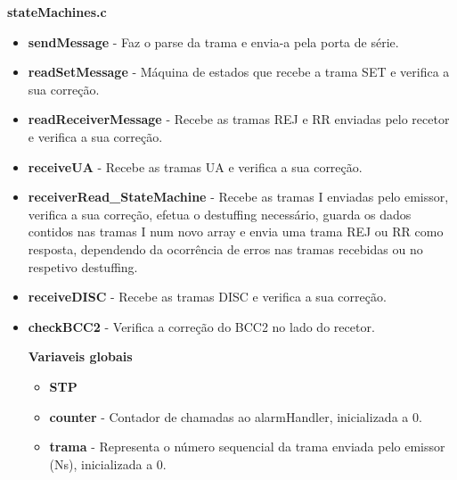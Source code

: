 \documentclass{article}
\begin{document}
\bigskip

\textbf{stateMachines.c}
\begin{itemize}
	\item \textbf{sendMessage } - Faz o parse da trama e envia-a pela porta de série.
	\item \textbf{readSetMessage } -  Máquina de estados que recebe a trama SET e verifica a sua correção.
	\item \textbf{readReceiverMessage } - Recebe as tramas REJ e RR enviadas pelo recetor e verifica a sua correção.
	\item \textbf{receiveUA} - Recebe as tramas UA e verifica a sua correção.
	
	\item \textbf{receiverRead\_StateMachine} - Recebe as tramas I enviadas pelo emissor, verifica a sua correção, efetua o destuffing necessário, guarda os dados contidos nas tramas I num novo array e envia uma trama REJ ou RR como resposta, dependendo da ocorrência de erros nas tramas recebidas ou no respetivo destuffing.
	\item \textbf{receiveDISC } - Recebe as tramas DISC e verifica a sua correção.
	\item \textbf{checkBCC2 } - Verifica a correção do BCC2 no lado do recetor.
	
	\textbf{Variaveis globais}
	\begin{itemize}
		\item \textbf{STP}
		\item \textbf{counter} - Contador de chamadas ao alarmHandler, inicializada a 0.
		\item \textbf{trama} - Representa o número sequencial da trama enviada pelo emissor (Ns), inicializada a 0.
	\end{itemize}
\end{itemize}

\bigskip
\end{document}
